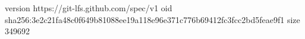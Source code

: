 version https://git-lfs.github.com/spec/v1
oid sha256:3e2c21fa48c0f649b81088ee19a118e96e371c776b69412fc3fcc2bd5feae9f1
size 349692
